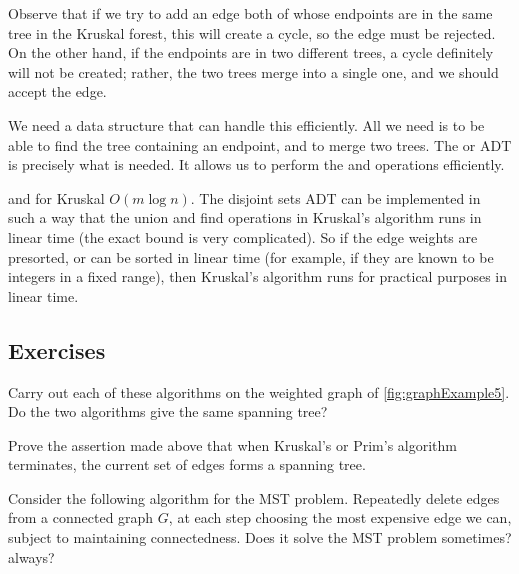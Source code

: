 Observe that if we try to add an edge both of whose endpoints are in
the same tree in the Kruskal forest, this will create a cycle, so the
edge must be rejected. On the other hand, if the endpoints are in two
different trees, a cycle definitely will not be created; rather, the two
trees merge into a single one, and we should accept the edge. 

We need a data structure that can handle this efficiently. All we need is to be
able to find the tree containing an endpoint, and to merge two trees. The
 or  ADT is precisely what
is needed. It allows us to perform the  and 
operations efficiently. %




 and for Kruskal $O(m \log n)$. The disjoint sets
ADT can be implemented in such a way that the union and find operations
in Kruskal's algorithm runs in  linear time (the exact bound
is very complicated). So if the edge weights are presorted, or can be
sorted in linear time (for example, if they are known to be integers in
a fixed range), then Kruskal's algorithm runs for practical purposes in
linear time.

\subsection*{Exercises}

\begin{Exercise} \label{ex:doMST}
Carry out each of these algorithms on the weighted
graph of \cref{fig:graphExample5}. Do the two algorithms give the
same spanning tree? 
\end{Exercise}

\begin{Exercise} \label{ex:spanning-tree}
Prove the assertion made above that when Kruskal's or Prim's algorithm 
terminates, the current set of edges forms a spanning tree.
\end{Exercise}

\begin{Exercise}\label{ex:silly-MST}
Consider the following algorithm for the MST problem. Repeatedly delete
edges from a connected graph $G$, at each step choosing the most
expensive edge we can, subject to maintaining connectedness. Does it
solve the MST problem sometimes? always?
\end{Exercise}

